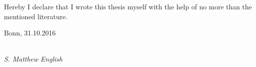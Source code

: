 \newpage

\thispagestyle{empty}

\begin{large}

\vspace*{6cm}

\noindent
Hereby I declare that I wrote this thesis myself with the help of no more than the mentioned literature.
\vspace{2cm}

\noindent
Bonn, 31.10.2016

\vspace{3cm}

\hspace*{7cm}%
\dotfill\\
\hspace*{8.5cm}%
\textit{S. Matthew English}

\end{large}
